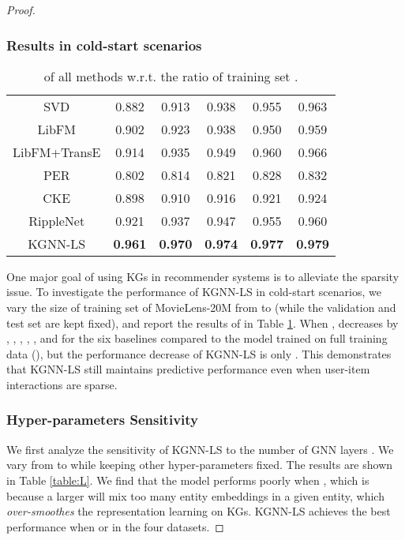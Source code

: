 \documentclass[sigconf]{acmart}
\begin{document}
\begin{proof}
			
		\subsubsection{Results in cold-start scenarios}
			\begin{table}[t]
				\centering
				\setlength{\tabcolsep}{6pt}
				\begin{tabular}{c|ccccc}
					\hline
					 &  &  &  &  &  \\
					\hline
					SVD & 0.882 & 0.913 & 0.938 & 0.955 & 0.963 \\
					LibFM & 0.902 & 0.923 & 0.938 & 0.950 & 0.959 \\
					LibFM+TransE & 0.914 & 0.935 & 0.949 & 0.960 & 0.966 \\
					PER & 0.802 & 0.814 & 0.821 & 0.828 & 0.832 \\
					CKE & 0.898 & 0.910 & 0.916 & 0.921 & 0.924 \\
					RippleNet & 0.921 & 0.937 & 0.947 & 0.955 & 0.960 \\
					KGNN-LS & \textbf{0.961} & \textbf{0.970} & \textbf{0.974} & \textbf{0.977} & \textbf{0.979} \\
					\hline
				\end{tabular}
				\vspace{0.05in}
				\caption{ of all methods w.r.t. the ratio of training set .}
				\label{table:sparse}
				\vspace{-0.2in}
			\end{table}
		
			One major goal of using KGs in recommender systems is to alleviate the sparsity issue.
			To investigate the performance of KGNN-LS in cold-start scenarios, we vary the size of training set of MovieLens-20M from  to  (while the validation and test set are kept fixed), and report the results of  in Table \ref{table:sparse}.
			When ,  decreases by , , , , , and  for the six baselines compared to the model trained on full training data (), but the performance decrease of KGNN-LS is only .
			This demonstrates that KGNN-LS still maintains predictive performance even when user-item interactions are sparse.
			
			
		\subsubsection{Hyper-parameters Sensitivity}
			We first analyze the sensitivity of KGNN-LS to the number of GNN layers .
			We vary  from  to  while keeping other hyper-parameters fixed.
			The results are shown in Table \ref{table:L}.
			We find that the model performs poorly when , which is because a larger  will mix too many entity embeddings in a given entity, which \textit{over-smoothes} the representation learning on KGs.
			KGNN-LS achieves the best performance when  or  in the four datasets.
			

\end{proof}
\end{document}
